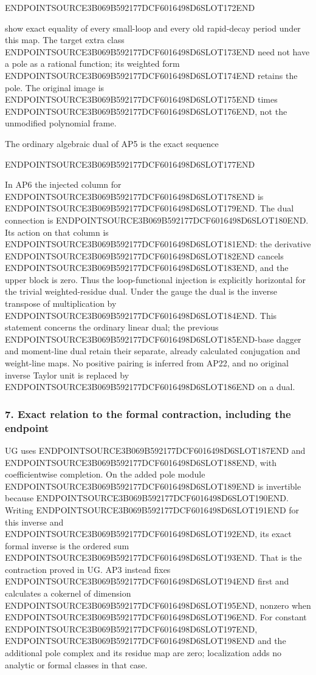 ENDPOINTSOURCE3B069B592177DCF6016498D6SLOT172END

show exact equality of every small-loop and every old rapid-decay period under this map. The target extra class ENDPOINTSOURCE3B069B592177DCF6016498D6SLOT173END need not have a pole as a rational function; its weighted form ENDPOINTSOURCE3B069B592177DCF6016498D6SLOT174END retains the pole. The original image is ENDPOINTSOURCE3B069B592177DCF6016498D6SLOT175END times ENDPOINTSOURCE3B069B592177DCF6016498D6SLOT176END, not the unmodified polynomial frame.

The ordinary algebraic dual of AP5 is the exact sequence

ENDPOINTSOURCE3B069B592177DCF6016498D6SLOT177END

In AP6 the injected column for ENDPOINTSOURCE3B069B592177DCF6016498D6SLOT178END is ENDPOINTSOURCE3B069B592177DCF6016498D6SLOT179END. The dual connection is ENDPOINTSOURCE3B069B592177DCF6016498D6SLOT180END. Its action on that column is ENDPOINTSOURCE3B069B592177DCF6016498D6SLOT181END: the derivative ENDPOINTSOURCE3B069B592177DCF6016498D6SLOT182END cancels ENDPOINTSOURCE3B069B592177DCF6016498D6SLOT183END, and the upper block is zero. Thus the loop-functional injection is explicitly horizontal for the trivial weighted-residue dual. Under the gauge the dual is the inverse transpose of multiplication by ENDPOINTSOURCE3B069B592177DCF6016498D6SLOT184END. This statement concerns the ordinary linear dual; the previous ENDPOINTSOURCE3B069B592177DCF6016498D6SLOT185END-base dagger and moment-line dual retain their separate, already calculated conjugation and weight-line maps. No positive pairing is inferred from AP22, and no original inverse Taylor unit is replaced by ENDPOINTSOURCE3B069B592177DCF6016498D6SLOT186END on a dual.

\subsubsection{7. Exact relation to the formal contraction, including the endpoint}\label{endpoint-analytic_pole--exact-relation-to-the-formal-contraction-including-the-endpoint}

UG uses ENDPOINTSOURCE3B069B592177DCF6016498D6SLOT187END and ENDPOINTSOURCE3B069B592177DCF6016498D6SLOT188END, with coefficientwise completion. On the added pole module ENDPOINTSOURCE3B069B592177DCF6016498D6SLOT189END is invertible because ENDPOINTSOURCE3B069B592177DCF6016498D6SLOT190END. Writing ENDPOINTSOURCE3B069B592177DCF6016498D6SLOT191END for this inverse and ENDPOINTSOURCE3B069B592177DCF6016498D6SLOT192END, its exact formal inverse is the ordered sum ENDPOINTSOURCE3B069B592177DCF6016498D6SLOT193END. That is the contraction proved in UG. AP3 instead fixes ENDPOINTSOURCE3B069B592177DCF6016498D6SLOT194END first and calculates a cokernel of dimension ENDPOINTSOURCE3B069B592177DCF6016498D6SLOT195END, nonzero when ENDPOINTSOURCE3B069B592177DCF6016498D6SLOT196END. For constant ENDPOINTSOURCE3B069B592177DCF6016498D6SLOT197END, ENDPOINTSOURCE3B069B592177DCF6016498D6SLOT198END and the additional pole complex and its residue map are zero; localization adds no analytic or formal classes in that case.

